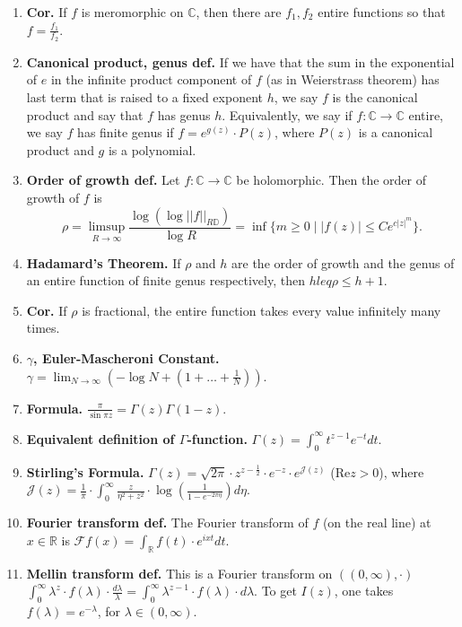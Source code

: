 \begin{enumerate}
	\item \textbf{Cor. } If $f$ is meromorphic on $\mathbb{C}$, then there are $f_1,f_2$ entire functions so that $f = \frac{f_1}{f_2}$. 
	\item \textbf{Canonical product, genus def. } If we have that the sum in the exponential of $e$ in the infinite product component of $f$ (as in Weierstrass theorem) has last term that is raised to a fixed exponent $h$, we say $f$ is the canonical product and say that $f$ has genus $h$. Equivalently, we say if $f: \mathbb{C} \to \mathbb{C}$ entire, we say $f$ has finite genus if $f = e^{g(z)} \cdot P(z)$, where $P(z)$ is a canonical product and $g$ is a polynomial. 
	\item \textbf{Order of growth def. } Let $f: \mathbb{C} \to \mathbb{C}$ be holomorphic. Then the order of growth of $f$ is 
	$$
	\rho = \limsup_{R \to \infty} \frac{\log(\log ||f||_{R \mathbb{D}})}{\log R} = \inf \{m \geq 0 \mid |f(z)| \leq Ce^{c|z|^m}\}. 
	$$
	\item \textbf{Hadamard's Theorem. } If $\rho$ and $h$ are the order of growth and the genus of an entire function of finite genus respectively, then $h leq \rho \leq h+1$. 
	\item \textbf{Cor. } If $\rho$ is fractional, the entire function takes every value infinitely many times. 
	\item \textbf{$\gamma$, Euler-Mascheroni Constant. } $\gamma = \lim_{N \to \infty} \left(-\log N + (1 + \dots + \frac{1}{N})\right)$. 
	\item \textbf{Formula. } $\frac{\pi}{\sin\pi z} = \Gamma(z)\Gamma(1-z)$. 
	\item \textbf{Equivalent definition of $\Gamma$-function. } $\Gamma(z) = \int_{0}^{\infty}t^{z-1}e^{-t} dt$. 
	\item \textbf{Stirling's Formula. } $\Gamma(z) = \sqrt{2\pi} \cdot z^{z - \frac{1}{2}} \cdot e^{-z} \cdot e^{\mathscr{J}(z)}$ ($\textrm{Re}z>0$), where $\mathscr{J}(z) = \frac{1}{\pi} \cdot \int_{0}^{\infty} \frac{z}{\eta^2 + z^2} \cdot \log \left(\frac{1}{1 - e^{-2\pi\eta}}\right) d\eta$. 
	\item \textbf{Fourier transform def. } The Fourier transform of $f$ (on the real line) at $x \in \mathbb{R}$ is $\mathscr{F} f(x) = \int_{\mathbb{R}} f(t) \cdot e^{ixt} dt$. 
	\item \textbf{Mellin transform def. } This is a Fourier transform on $((0,\infty), \cdot)$ $\int_{0}^{\infty} \lambda^z \cdot f(\lambda) \cdot \frac{d \lambda}{\lambda} = \int_{0}^{\infty} \lambda^{z-1} \cdot f(\lambda) \cdot d\lambda$. To get $I(z)$, one takes $f(\lambda) = e^{-\lambda}$, for $\lambda \in (0,\infty)$. 

\end{enumerate}
